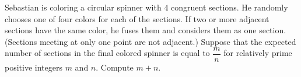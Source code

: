 Sebastian is coloring a circular spinner with $4$ congruent sections. He randomly chooses one of four colors for each of the sections. If two or more adjacent sections have the same color, he fuses them and considers them as one section. (Sections meeting at only one point are not adjacent.) Suppose that the expected number of sections in the final colored spinner is equal to  $\dfrac{m}{n}$ for relatively prime positive integers $m$ and $n$. Compute $m + n$.
